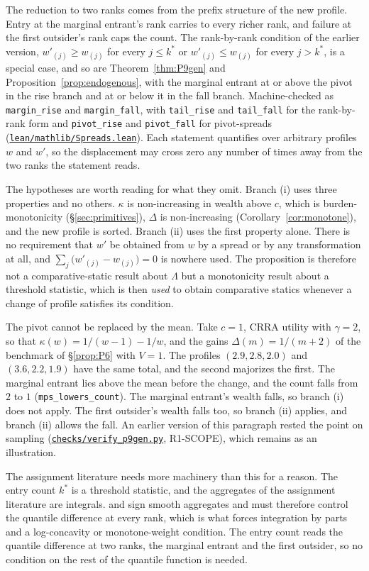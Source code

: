 \documentclass[11pt]{article}
\newcommand{\file}[1]{\href{run:#1}{\texttt{#1}}}
\begin{document}
The reduction to two ranks comes from the prefix structure of the new profile.
Entry at the marginal entrant's rank carries to every richer rank, and failure
at the first outsider's rank caps the count. The rank-by-rank condition of the
earlier version, $w'_{(j)}\ge w_{(j)}$ for every $j\le k^*$ or
$w'_{(j)}\le w_{(j)}$ for every $j>k^*$, is a special case, and so are
Theorem~\ref{thm:P9gen} and Proposition~\ref{prop:endogenous}, with the
marginal entrant at or above the pivot in the rise branch and at or below it in
the fall branch. Machine-checked as \texttt{margin\_rise} and
\texttt{margin\_fall}, with \texttt{tail\_rise} and \texttt{tail\_fall} for the
rank-by-rank form and \texttt{pivot\_rise} and \texttt{pivot\_fall} for
pivot-spreads (\file{lean/mathlib/Spreads.lean}). Each statement quantifies
over arbitrary profiles $w$ and $w'$, so the displacement may cross zero any
number of times away from the two ranks the statement reads.

The hypotheses are worth reading for what they omit. Branch (i) uses three
properties and no others. $\kappa$ is non-increasing in wealth above $c$, which
is burden-monotonicity (\S\ref{sec:primitives}), $\Delta$ is non-increasing
(Corollary~\ref{cor:monotone}), and the new profile is sorted. Branch (ii)
uses the first property alone. There is no
requirement that $w'$ be obtained from $w$ by a spread or by any transformation
at all, and $\sum_j\bigl(w'_{(j)}-w_{(j)}\bigr)=0$ is nowhere used. The
proposition is therefore not a comparative-static result about $\Lambda$ but a
monotonicity result about a threshold statistic, which is then \emph{used} to
obtain comparative statics whenever a change of profile satisfies its
condition.

The pivot cannot be replaced by the mean. Take $c=1$, CRRA utility with
$\gamma=2$, so that $\kappa(w)=1/(w-1)-1/w$, and the gains $\Delta(m)=1/(m+2)$
of the benchmark of \S\ref{prop:P6} with $V=1$. The profiles $(2.9,2.8,2.0)$
and $(3.6,2.2,1.9)$ have the same total, and the second majorizes the first.
The marginal entrant lies above the mean before the change, and the count falls
from $2$ to $1$ (\texttt{mps\_lowers\_count}). The marginal entrant's wealth
falls, so branch (i) does not apply. The first outsider's wealth falls too, so
branch (ii) applies, and branch (ii) allows the fall. An earlier version of
this paragraph rested the point on sampling (\file{checks/verify\_p9gen.py},
R1-SCOPE), which remains as an illustration.

The assignment literature needs more machinery than this for a reason. The
entry count $k^*$ is a threshold statistic, and the aggregates of the
assignment literature are integrals. \citet{Suen2007} and
\citet{CostrellLoury2004} sign smooth aggregates and must therefore control
the quantile difference at every rank, which is what forces integration by
parts and a log-concavity or monotone-weight condition. The entry count reads
the quantile difference at two ranks, the marginal entrant and the first
outsider, so no condition on the rest of the quantile function is needed.
\end{document}
